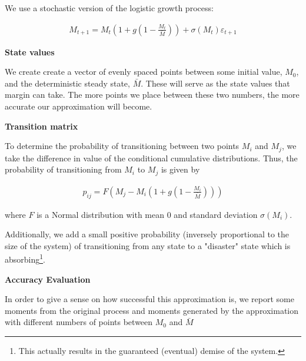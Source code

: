 
We use a stochastic version of the logistic growth process:

\begin{align*}
  M_{t+1} = M_{t} \left(1 + g \left(1 - \frac{M_{t}}{\bar{M}} \right)\right) + \sigma(M_{t}) \varepsilon_{t+1}
\end{align*}

\textbf{State values}

We create create a vector of evenly spaced points between some initial value, $M_0$, and the
deterministic steady state, $\bar{M}$. These will serve as the state values that margin can take.
The more points we place between these two numbers, the more accurate our approximation will become.

\textbf{Transition matrix}

To determine the probability of transitioning between two points $M_i$ and $M_j$, we take the
difference in value of the conditional cumulative distributions. Thus, the probability of
transitioning from $M_i$ to $M_j$ is given by

\begin{align*}
  p_{ij} = F\left(M_j - M_i \left(1 + g \left(1 - \frac{M_i}{\bar{M}}\right) \right) \right)
\end{align*}

where $F$ is a Normal distribution with mean 0 and standard deviation $\sigma(M_i)$.

Additionally, we add a small positive probability (inversely proportional to the size of the system)
of transitioning from any state to a "disaster" state which is absorbing\footnote{This actually
results in the guaranteed (eventual) demise of the system.}.

\textbf{Accuracy Evaluation}

In order to give a sense on how successful this approximation is, we report some moments from the
original process and moments generated by the approximation with different numbers of points between
$M_0$ and $\bar{M}$
